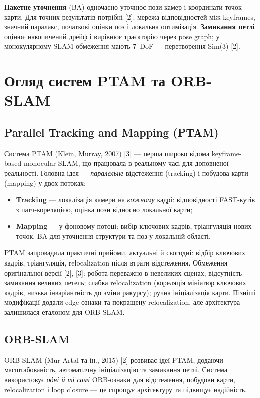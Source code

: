 \documentclass[14pt,a4paper,openany]{extreport}
\begin{document}
\textbf{Пакетне уточнення} (BA) одночасно уточнює пози камер і координати точок карти. Для точних результатів потрібні [2]: мережа відповідностей між keyframes, значний паралакс, початкові оцінки поз і локальна оптимізація. \textbf{Замикання петлі} оцінює накопичений дрейф і вирівнює траєкторію через pose graph; у монокулярному SLAM обмеження мають 7~DoF --- перетворення Sim(3) [2].

\section{Огляд систем PTAM та ORB-SLAM}

\subsection{Parallel Tracking and Mapping (PTAM)}

Система PTAM (Klein, Murray, 2007) [3] --- перша широко відома keyframe-based monocular SLAM, що працювала в реальному часі для доповненої реальності. Головна ідея --- \emph{паралельне} відстеження (tracking) і побудова карти (mapping) у двох потоках:
\begin{itemize}[leftmargin=*]
  \item \textbf{Tracking} --- локалізація камери на \emph{кожному} кадрі: відповідності FAST-кутів з патч-кореляцією, оцінка пози відносно локальної карти;
  \item \textbf{Mapping} --- у фоновому потоці: вибір ключових кадрів, тріангуляція нових точок, BA для уточнення структури та поз у локальній області.
\end{itemize}

PTAM запровадила практичні прийоми, актуальні й сьогодні: відбір ключових кадрів, тріангуляція, relocalization після втрати відстеження. Обмеження оригінальної версії [2], [3]: робота переважно в невеликих сценах; відсутність замикання великих петель; слабка relocalization (кореляція мініатюр ключових кадрів, низька інваріантність до зміни ракурсу); ручна ініціалізація карти. Пізніші модифікації додали edge-ознаки та покращену relocalization, але архітектура залишилася еталоном для ORB-SLAM.

\subsection{ORB-SLAM}

ORB-SLAM (Mur-Artal та ін., 2015) [2] розвиває ідеї PTAM, додаючи масштабованість, автоматичну ініціалізацію та замикання петлі. Система використовує \emph{одні й ті самі} ORB-ознаки для відстеження, побудови карти, relocalization і loop closure --- це спрощує архітектуру та підвищує надійність.
\end{document}
